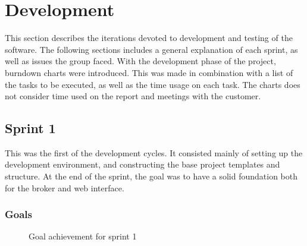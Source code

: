 \section{Development}

This section describes the iterations devoted to development and testing of the software. The following sections includes a general explanation of each sprint, as well as issues the group faced. With the development phase of the project, burndown charts were introduced. This was made in combination with a list of the tasks to be executed, as well as the time usage on each task. The charts does not consider time used on the report and meetings with the customer.

\subsection{Sprint 1}

This was the first of the development cycles. It consisted mainly of setting up the development environment, and constructing the base project templates and structure. At the end of the sprint, the goal was to have a solid foundation both for the broker and web interface.

\subsubsection{Goals}

\begin{center}
  \begin{figure}[ht!]
    \caption{Goal achievement for sprint 1}
    \label{fig:sprint 1, goals}
  \end{figure}
\end{center}

